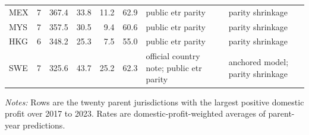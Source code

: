 \begin{table}[H]
\begin{adjustbox}{max width=\textwidth,center}
\begin{tabular}{@{}lrrrrrL{3.0cm}L{2.7cm}@{}}
MEX & 7 &    367.4 & 33.8 & 11.2 & 62.9 & public etr parity & parity shrinkage \\
MYS & 7 &    357.5 & 30.5 &  9.4 & 60.6 & public etr parity & parity shrinkage \\
HKG & 6 &    348.2 & 25.3 &  7.5 & 55.0 & public etr parity & parity shrinkage \\
SWE & 7 &    325.6 & 43.7 & 25.2 & 62.3 & official country note; public etr parity & anchored model; parity shrinkage \\
\bottomrule
\end{tabular}
\end{adjustbox}

\vspace{0.35em}
\noindent\begin{minipage}{\textwidth}
\footnotesize\raggedright\textit{Notes:} Rows are the twenty parent jurisdictions with the largest positive domestic profit over 2017 to 2023. Rates are domestic-profit-weighted averages of parent-year predictions.
\end{minipage}
\end{table}
